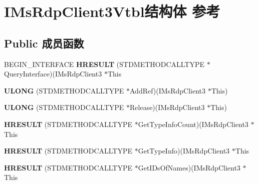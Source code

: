 \hypertarget{struct_i_ms_rdp_client3_vtbl}{}\section{I\+Ms\+Rdp\+Client3\+Vtbl结构体 参考}
\label{struct_i_ms_rdp_client3_vtbl}
\subsection*{Public 成员函数}
\begin{DoxyCompactItemize}
\item 
\mbox{\label{struct_i_ms_rdp_client3_vtbl_aa7e99530e202a9b1d84ce128e9c74175}} 
B\+E\+G\+I\+N\+\_\+\+I\+N\+T\+E\+R\+F\+A\+CE {\bfseries H\+R\+E\+S\+U\+LT} (S\+T\+D\+M\+E\+T\+H\+O\+D\+C\+A\+L\+L\+T\+Y\+PE $\ast$Query\+Interface)(I\+Ms\+Rdp\+Client3 $\ast$This
\item 
\mbox{\label{struct_i_ms_rdp_client3_vtbl_a2b7d6a7efa9269c2a7ecc272fdc3dae8}} 
{\bfseries U\+L\+O\+NG} (S\+T\+D\+M\+E\+T\+H\+O\+D\+C\+A\+L\+L\+T\+Y\+PE $\ast$Add\+Ref)(I\+Ms\+Rdp\+Client3 $\ast$This)
\item 
\mbox{\label{struct_i_ms_rdp_client3_vtbl_a1cbd6fa50c82f8c92d93888f6b967118}} 
{\bfseries U\+L\+O\+NG} (S\+T\+D\+M\+E\+T\+H\+O\+D\+C\+A\+L\+L\+T\+Y\+PE $\ast$Release)(I\+Ms\+Rdp\+Client3 $\ast$This)
\item 
\mbox{\label{struct_i_ms_rdp_client3_vtbl_a661bbfc95cebc719b5b15180bfd5c575}} 
{\bfseries H\+R\+E\+S\+U\+LT} (S\+T\+D\+M\+E\+T\+H\+O\+D\+C\+A\+L\+L\+T\+Y\+PE $\ast$Get\+Type\+Info\+Count)(I\+Ms\+Rdp\+Client3 $\ast$This
\item 
\mbox{\label{struct_i_ms_rdp_client3_vtbl_a69b649138c90b4f0582675b880e43406}} 
{\bfseries H\+R\+E\+S\+U\+LT} (S\+T\+D\+M\+E\+T\+H\+O\+D\+C\+A\+L\+L\+T\+Y\+PE $\ast$Get\+Type\+Info)(I\+Ms\+Rdp\+Client3 $\ast$This
\item 
\mbox{\label{struct_i_ms_rdp_client3_vtbl_a617e0423e8784871b15759d8f7d9c576}} 
{\bfseries H\+R\+E\+S\+U\+LT} (S\+T\+D\+M\+E\+T\+H\+O\+D\+C\+A\+L\+L\+T\+Y\+PE $\ast$Get\+I\+Ds\+Of\+Names)(I\+Ms\+Rdp\+Client3 $\ast$This

\end{DoxyCompactItemize}
